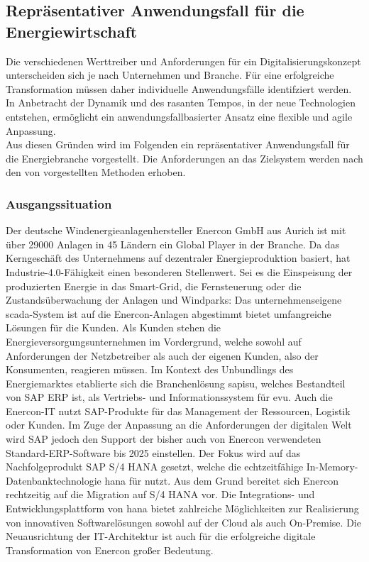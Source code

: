 \subsection{Repräsentativer Anwendungsfall für die Energiewirtschaft}\label{usecase}

Die verschiedenen Werttreiber und Anforderungen für ein Digitalisierungskonzept unterscheiden sich je nach Unternehmen und Branche.
Für eine erfolgreiche Transformation müssen daher individuelle Anwendungsfälle identifziert werden.
In Anbetracht der Dynamik und des rasanten Tempos, in der neue Technologien entstehen,
ermöglicht ein anwendungsfallbasierter Ansatz eine flexible und agile Anpassung. \citep[S. 31]{Acharya2019}
\\Aus diesen Gründen wird im Folgenden ein repräsentativer Anwendungsfall für die Energiebranche vorgestellt. Die Anforderungen an das Zielsystem werden nach den von \citet{Lauenroth2016} vorgestellten Methoden erhoben.

\subsubsection{Ausgangssituation} \label{usecase}

Der deutsche Windenergieanlagenhersteller Enercon GmbH aus Aurich ist mit über 29000 Anlagen in 45 Ländern ein Global Player in der Branche. Da das Kerngeschäft des Unternehmens auf dezentraler Energieproduktion basiert, hat Industrie-4.0-Fähigkeit einen besonderen Stellenwert. Sei es die Einspeisung der produzierten Energie in das Smart-Grid, die Fernsteuerung oder die Zustandsüberwachung der Anlagen und Windparks: Das unternehmenseigene \acf{scada}-System ist auf die Enercon-Anlagen abgestimmt bietet umfangreiche Lösungen für die Kunden. Als Kunden stehen die Energieversorgungsunternehmen im Vordergrund, welche sowohl auf Anforderungen der Netzbetreiber als auch der eigenen Kunden, also der Konsumenten, reagieren müssen. Im Kontext des Unbundlings des Energiemarktes etablierte sich die Branchenlösung \acf{sapisu}, welches Bestandteil von SAP ERP ist, als Vertriebs- und Informationssystem für \ac{evu}. Auch die Enercon-IT nutzt SAP-Produkte für das Management der Ressourcen, Logistik oder Kunden. Im Zuge der Anpassung an die Anforderungen der digitalen Welt wird SAP jedoch den Support der bisher auch von Enercon verwendeten Standard-ERP-Software bis 2025 einstellen. Der Fokus wird auf das Nachfolgeprodukt SAP S/4 HANA gesetzt, welche die echtzeitfähige In-Memory-Datenbanktechnologie \acf{hana} für nutzt. Aus dem Grund bereitet sich Enercon rechtzeitig auf die Migration auf S/4 HANA vor. Die Integrations- und Entwicklungsplattform von \ac{hana} bietet zahlreiche Möglichkeiten zur Realisierung von innovativen Softwarelösungen sowohl auf der Cloud als auch On-Premise. Die Neuausrichtung der IT-Architektur ist auch für die erfolgreiche digitale Transformation von Enercon großer Bedeutung.

